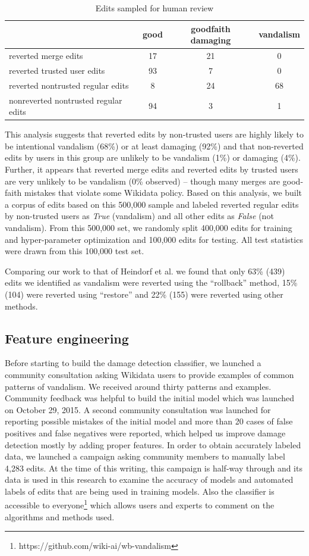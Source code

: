 \documentclass{sig-alternate-2013}
\begin{document}
\begin{table}
\centering
\caption{Edits sampled for human review}
\begin{tabular}{l|c|c|c} \hline
& good & good\-faith damaging & vandalism \\ \hline
reverted merge edits & 17 & 21 & 0 \\ \hline
reverted trusted user edits & 93 & 7 & 0 \\ \hline
reverted non\-trusted regular edits & 8 & 24 & 68 \\ \hline
non\-reverted non\-trusted regular edits & 94 & 3 & 1
\end{tabular}
\end{table}
This analysis suggests that reverted edits by non-trusted users are highly likely to be intentional vandalism (68\%) or at least damaging (92\%) and that non-reverted edits by users in this group are unlikely to be vandalism (1\%) or damaging (4\%).  Further, it appears that reverted merge edits and reverted edits by trusted users are very unlikely to be vandalism (0\% observed) – though many merges are good-faith mistakes that violate some Wikidata policy. Based on this analysis, we built a corpus of edits based on this 500,000 sample and labeled reverted regular edits by non-trusted users as \textit{True} (vandalism) and all other edits as \textit{False} (not vandalism). From this 500,000 set, we randomly split 400,000 edits for training and hyper-parameter optimization and 100,000 edits for testing. All test statistics were drawn from this 100,000 test set.

Comparing our work to that of Heindorf et al. \cite{heindorf:towards} we found that only 63\% (439) edits we identified as vandalism were reverted using the ``rollback'' method, 15\% (104) were reverted using ``restore'' and 22\% (155) were reverted using other methods.

\subsection{Feature engineering}
Before starting to build the damage detection classifier, we launched a community consultation asking Wikidata users to provide examples of common patterns of vandalism. We received around thirty patterns and examples. Community feedback was helpful to build the initial model which was launched on October 29, 2015. A second community consultation was launched for reporting possible mistakes of the initial model and more than 20 cases of false positives and false negatives were reported, which helped us improve damage detection mostly by adding proper features. In order to obtain accurately labeled data, we launched a campaign asking community members to manually label 4,283 edits. At the time of this writing, this campaign is half-way through and its data is used in this research to examine the accuracy of models and automated labels of edits that are being used in training models. Also the classifier is accessible to everyone\footnote{https://github.com/wiki-ai/wb-vandalism} which allows users and experts to comment on the algorithms and methods used.
\end{document}
